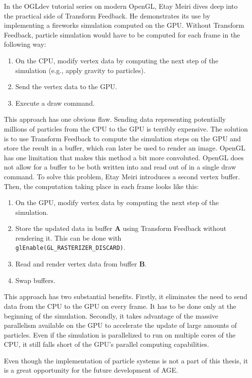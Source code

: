 \documentclass[
  digital,     %
  oneside,     %
  nosansbold,  %
  nocolorbold, %
  lof,         %
  lot,         %
]{fithesis4}
\begin{document}
In the OGLdev tutorial series on modern OpenGL, Etay Meiri \cite{ogl-particle-system} dives deep into the practical
side of Transform Feedback. He demonstrates its use by implementing a fireworks simulation computed on the GPU.
Without Transform Feedback, particle simulation would have to be computed for each frame in the following way:
\begin{enumerate}
    \item On the CPU, modify vertex data by computing the next step of the simulation (e.g., apply gravity to particles).
    \item Send the vertex data to the GPU.
    \item Execute a draw command.
\end{enumerate}
This approach has one obvious flaw. Sending data representing potentially millions of particles from the CPU to the GPU
is terribly expensive. The solution is to use Transform Feedback to compute the simulation steps on the GPU and store
the result in a buffer, which can later be used to render an image. OpenGL has one limitation that makes this method
a bit more convoluted. OpenGL does not allow for a buffer to be both written into and read out of in a single draw command.
To solve this problem, Etay Meiri \cite{ogl-particle-system} introduces a second vertex buffer.
Then, the computation taking place in each frame looks like this:
\begin{enumerate}
    \item On the GPU, modify vertex data by computing the next step of the simulation.
    \item Store the updated data in buffer \textbf{A} using Transform Feedback without rendering it.
    This can be done with \\\verb+glEnable(GL_RASTERIZER_DISCARD)+.
    \item Read and render vertex data from buffer \textbf{B}.
    \item Swap buffers.
\end{enumerate}
This approach has two substantial benefits. Firstly, it eliminates the need to send data from the CPU to the GPU
on every frame. It has to be done only at the beginning of the simulation. Secondly, it takes advantage of the
massive parallelism available on the GPU to accelerate the update of large amounts of particles. Even if the simulation
is parallelized to run on multiple cores of the CPU, it still falls short of the GPU's parallel computing capabilities.

Even though the implementation of particle systems is not a part of this thesis,
it is a great opportunity for the future development of AGE.
\end{document}
